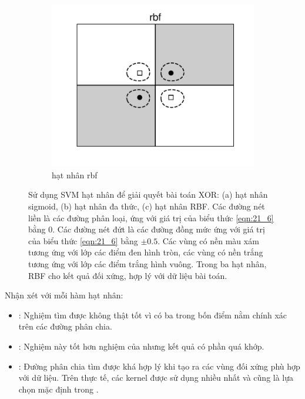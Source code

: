 \begin{figure}[t]
\begin{subfigure}{0.325\textwidth}
\end{subfigure}
\begin{subfigure}{0.325\textwidth}
\includegraphics[width=\linewidth]{Chapters/09_SupportVectorMachines/21_kernelsvm/plt/rbf1.pdf}
\caption{hạt nhân rbf}
\end{subfigure}

\caption{
Sử dụng SVM hạt nhân để giải quyết bài toán XOR: (a) hạt nhân sigmoid, (b)
hạt nhân đa thức, (c) hạt nhân RBF. Các đường nét liền là các đường phân loại,
ứng với giá trị của biểu thức \eqref{eqn:21_6} bằng 0. Các đường nét đứt là
các đường đồng mức ứng với giá trị của biểu thức \eqref{eqn:21_6} bằng $\pm
0.5$. Các vùng có nền màu xám tương ứng với lớp các điểm đen hình tròn, các
vùng có nền trắng tương ứng với lớp các điểm trắng hình vuông. Trong ba
hạt nhân, RBF cho kết quả đối xứng, hợp lý
với dữ liệu bài toán. }
\label{fig:21_2}
\end{figure}

Nhận xét với mỗi hàm hạt nhân:
\begin{itemize}
\item {}: Nghiệm tìm được không thật tốt vì có ba trong
bốn điểm nằm chính xác trên các đường phân chia.

\item {}: Nghiệm này tốt hơn nghiệm của
 nhưng kết quả có phần quá khớp.

\item {}: Đường phân
chia tìm được khá hợp lý khi tạo ra các vùng đối xứng phù hợp với dữ liệu. Trên thực tế, các  kernel được sử dụng nhiều nhất và cũng là lựa chọn mặc định trong .
\end{itemize}


